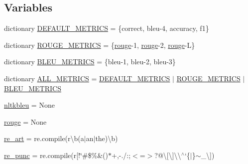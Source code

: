 \subsection*{Variables}
\begin{DoxyCompactItemize}
\item 
dictionary \hyperlink{namespaceparlai_1_1core_1_1metrics_a5cd26a43d8156c993f30c5a707021562}{D\+E\+F\+A\+U\+L\+T\+\_\+\+M\+E\+T\+R\+I\+CS} = \{\textquotesingle{}correct\textquotesingle{}, \textquotesingle{}bleu-\/4\textquotesingle{}, \textquotesingle{}accuracy\textquotesingle{}, \textquotesingle{}f1\textquotesingle{}\}
\item 
dictionary \hyperlink{namespaceparlai_1_1core_1_1metrics_ac01c4a05e91baee81e771e8f7ae9e7e4}{R\+O\+U\+G\+E\+\_\+\+M\+E\+T\+R\+I\+CS} = \{\textquotesingle{}\hyperlink{namespaceparlai_1_1core_1_1metrics_ae0fddd2325f5dc52b2a367e52056242a}{rouge}-\/1\textquotesingle{}, \textquotesingle{}\hyperlink{namespaceparlai_1_1core_1_1metrics_ae0fddd2325f5dc52b2a367e52056242a}{rouge}-\/2\textquotesingle{}, \textquotesingle{}\hyperlink{namespaceparlai_1_1core_1_1metrics_ae0fddd2325f5dc52b2a367e52056242a}{rouge}-\/L\textquotesingle{}\}
\item 
dictionary \hyperlink{namespaceparlai_1_1core_1_1metrics_a5f8ea2258b1137554e4544c463ffc101}{B\+L\+E\+U\+\_\+\+M\+E\+T\+R\+I\+CS} = \{\textquotesingle{}bleu-\/1\textquotesingle{}, \textquotesingle{}bleu-\/2\textquotesingle{}, \textquotesingle{}bleu-\/3\textquotesingle{}\}
\item 
dictionary \hyperlink{namespaceparlai_1_1core_1_1metrics_add79f9806fe8f3343a620c790eb98be7}{A\+L\+L\+\_\+\+M\+E\+T\+R\+I\+CS} = \hyperlink{namespaceparlai_1_1core_1_1metrics_a5cd26a43d8156c993f30c5a707021562}{D\+E\+F\+A\+U\+L\+T\+\_\+\+M\+E\+T\+R\+I\+CS} $\vert$ \hyperlink{namespaceparlai_1_1core_1_1metrics_ac01c4a05e91baee81e771e8f7ae9e7e4}{R\+O\+U\+G\+E\+\_\+\+M\+E\+T\+R\+I\+CS} $\vert$ \hyperlink{namespaceparlai_1_1core_1_1metrics_a5f8ea2258b1137554e4544c463ffc101}{B\+L\+E\+U\+\_\+\+M\+E\+T\+R\+I\+CS}
\item 
\hyperlink{namespaceparlai_1_1core_1_1metrics_aae1295106c31b93af8fbe0da66ebe000}{nltkbleu} = None
\item 
\hyperlink{namespaceparlai_1_1core_1_1metrics_ae0fddd2325f5dc52b2a367e52056242a}{rouge} = None
\item 
\hyperlink{namespaceparlai_1_1core_1_1metrics_a037f8e3330e87d9de75fac930eac7fc2}{re\+\_\+art} = re.\+compile(r\textquotesingle{}\textbackslash{}b(a$\vert$an$\vert$the)\textbackslash{}b\textquotesingle{})
\item 
\hyperlink{namespaceparlai_1_1core_1_1metrics_a334cb58cda231eb62dea1fd375f8d687}{re\+\_\+punc} = re.\+compile(r\textquotesingle{}\mbox{[}!\char`\"{}\#\$\%\&()$\ast$+,-\/./\+:;$<$=$>$?@\textbackslash{}\mbox{[}\textbackslash{}\mbox{]}\textbackslash{}\textbackslash{}$^\wedge$`\{$\vert$\}$\sim$\+\_\+\textbackslash{}\textquotesingle{}\mbox{]}\textquotesingle{})
\end{DoxyCompactItemize}


